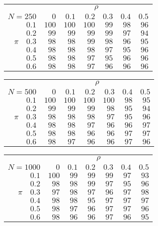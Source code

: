 \begin{tabular}{r|rrrrrr}
\hline\hline
 &\multicolumn{6}{c}{$\rho$} \\ 
 $N = 250$ & $0$ & $0.1$ & $0.2$ & $0.3$ & $0.4$ & $0.5$ \\ 
 \hline$0.1$ & $100$ & $100$ & $100$ & $99$ & $98$ & $96$\\ 
$0.2$ & $99$ & $99$ & $99$ & $99$ & $97$ & $94$\\ 
$\pi\quad$$0.3$ & $98$ & $98$ & $99$ & $98$ & $96$ & $95$\\ 
$0.4$ & $98$ & $98$ & $98$ & $97$ & $95$ & $96$\\ 
$0.5$ & $98$ & $98$ & $97$ & $95$ & $96$ & $96$\\ 
$0.6$ & $98$ & $98$ & $97$ & $96$ & $96$ & $96$\\ 
 \hline 
 \end{tabular}
 
 \vspace{2em} 
 
\begin{tabular}{r|rrrrrr}
\hline\hline
 &\multicolumn{6}{c}{$\rho$} \\ 
 $N = 500$ & $0$ & $0.1$ & $0.2$ & $0.3$ & $0.4$ & $0.5$ \\ 
 \hline$0.1$ & $100$ & $100$ & $100$ & $100$ & $98$ & $95$\\ 
$0.2$ & $99$ & $99$ & $99$ & $98$ & $95$ & $94$\\ 
$\pi\quad$$0.3$ & $98$ & $98$ & $98$ & $97$ & $95$ & $96$\\ 
$0.4$ & $98$ & $98$ & $97$ & $96$ & $96$ & $97$\\ 
$0.5$ & $98$ & $98$ & $96$ & $96$ & $97$ & $97$\\ 
$0.6$ & $98$ & $97$ & $96$ & $96$ & $97$ & $96$\\ 
 \hline 
 \end{tabular}
 
 \vspace{2em} 
 
\begin{tabular}{r|rrrrrr}
\hline\hline
 &\multicolumn{6}{c}{$\rho$} \\ 
 $N = 1000$ & $0$ & $0.1$ & $0.2$ & $0.3$ & $0.4$ & $0.5$ \\ 
 \hline$0.1$ & $100$ & $99$ & $99$ & $99$ & $97$ & $93$\\ 
$0.2$ & $98$ & $98$ & $99$ & $97$ & $95$ & $96$\\ 
$\pi\quad$$0.3$ & $97$ & $98$ & $97$ & $96$ & $97$ & $98$\\ 
$0.4$ & $98$ & $98$ & $95$ & $97$ & $97$ & $97$\\ 
$0.5$ & $98$ & $97$ & $96$ & $97$ & $97$ & $96$\\ 
$0.6$ & $98$ & $96$ & $96$ & $97$ & $96$ & $95$\\ 
 \hline 
 \end{tabular}